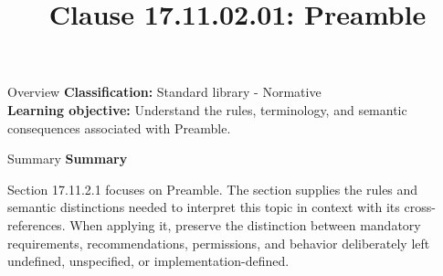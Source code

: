 \documentclass[10pt,letterpaper]{article}
\title{Clause 17.11.02.01: Preamble}
\author{}
\date{}
\begin{document}
\maketitle
\begin{CornellOverviewBox}{Overview}
\textbf{Classification:} Standard library - Normative\\[2pt]
\textbf{Learning objective:} Understand the rules, terminology, and semantic consequences associated with Preamble.
\end{CornellOverviewBox}\begin{CornellSummaryBox}{Summary}
{\sffamily\bfseries\color{Accent} Summary}\par\vspace{3pt}Section 17.11.2.1 focuses on Preamble. The section supplies the rules and semantic distinctions needed to interpret this topic in context with its cross-references. When applying it, preserve the distinction between mandatory requirements, recommendations, permissions, and behavior deliberately left undefined, unspecified, or implementation-defined.
\end{CornellSummaryBox}
\end{document}
